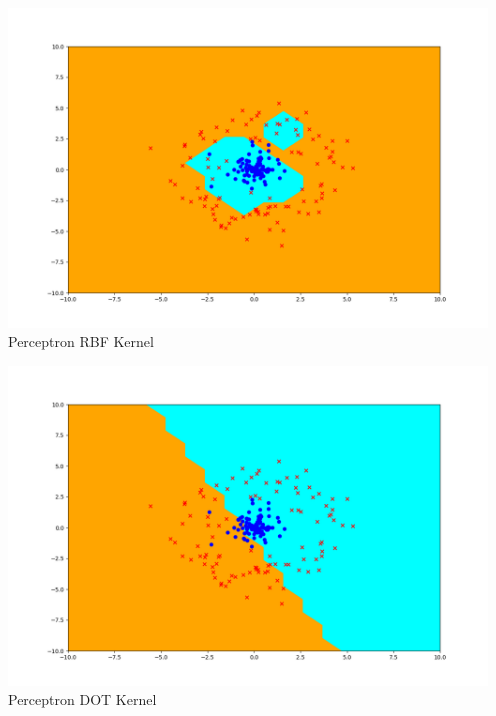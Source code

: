 \begin{answer}

\centering

\includegraphics[width=5in]{perceptron_rbf_output.png} 
Perceptron RBF Kernel

\includegraphics[width=5in]{perceptron_dot_output.png}
Perceptron DOT Kernel

\end{answer}


